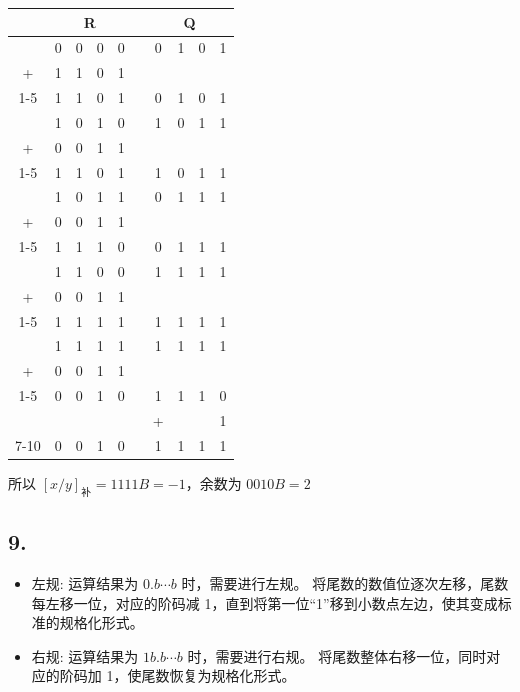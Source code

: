 \documentclass[12pt, a4paper]{ctexart}
\begin{document}
\begin{table}[H]
    \centering
    \begin{tabular}{cccccccccc}
        \hline
        & \multicolumn{4}{c}{R} && \multicolumn{4}{c}{Q} \\
        \hline
          & 0&0&0&0 && 0&1&0&\multicolumn{1}{c|}{1} \\ \hdashline
        + & 1&1&0&1 &\multicolumn{5}{c|}{}          \\ \cline{1-5}
          & 1&1&0&1 && 0&1&0&\multicolumn{1}{c|}{1} \\ \hdashline
          & 1&0&1&0 && 1&0&\multicolumn{1}{c|}{1}&1 \\
        + & 0&0&1&1 &\multicolumn{4}{c|}{}          \\ \cline{1-5}
          & 1&1&0&1 && 1&0&\multicolumn{1}{c|}{1}&1 \\ \hdashline
          & 1&0&1&1 && 0&\multicolumn{1}{c|}{1}&1&1 \\
        + & 0&0&1&1 &\multicolumn{3}{c|}{}          \\ \cline{1-5}
          & 1&1&1&0 && 0&\multicolumn{1}{c|}{1}&1&1 \\ \hdashline
          & 1&1&0&0 && \multicolumn{1}{c|}{1}&1&1&1 \\
        + & 0&0&1&1 &\multicolumn{2}{c|}{}          \\ \cline{1-5}
          & 1&1&1&1 && \multicolumn{1}{c|}{1}&1&1&1 \\ \hdashline
          & 1&1&1&1 &\multicolumn{1}{c|}{}& 1&1&1&1 \\
        + & 0&0&1&1 &\multicolumn{1}{c|}{}          \\ \cline{1-5}
          & 0&0&1&0 &\multicolumn{1}{c|}{}& 1&1&1&0 \\
          & &&&     && + &&&1                       \\ \cline{7-10}
          & 0&0&1&0 && 1&1&1&1                      \\ \hline
    \end{tabular}
\end{table}

所以 $\left[x/y\right]_\text{补}=1111B=-1$，余数为 $0010B=2$

\subsection*{9.}

\begin{itemize}
  \item 左规: 运算结果为 $0.b\cdots b$ 时，需要进行左规。
  将尾数的数值位逐次左移，尾数每左移一位，对应的阶码减 1，直到将第一位“1”移到小数点左边，使其变成标准的规格化形式。
  \item 右规: 运算结果为 $1b.b\cdots b$ 时，需要进行右规。
  将尾数整体右移一位，同时对应的阶码加 1，使尾数恢复为规格化形式。
\end{itemize}
\end{document}
